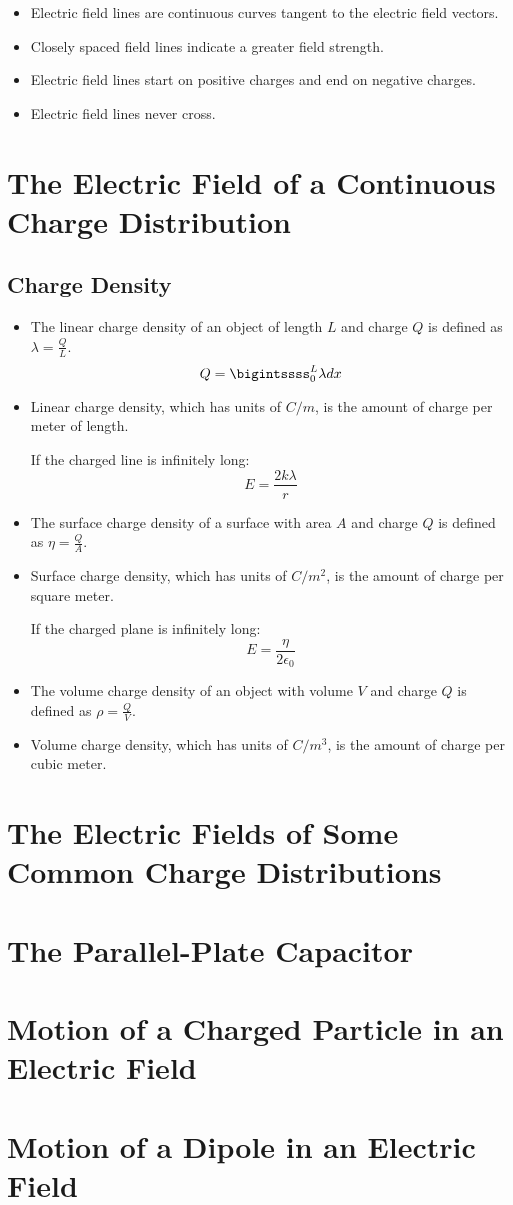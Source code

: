 \documentclass{article}
\begin{document}
\begin{itemize}
    \item Electric field lines are continuous curves tangent to the electric field vectors.
    \item Closely spaced field lines indicate a greater field strength.
    \item Electric field lines start on positive charges and end on negative charges.
    \item Electric field lines never cross.
\end{itemize}

\section*{The Electric Field of a Continuous Charge Distribution}

\subsection*{Charge Density}
\begin{itemize}
    \item The linear charge density of an object of length $L$ and charge $Q$ is defined as $\lambda=\frac{Q}{L}$.
    \[Q=\bigintssss_0^L\lambda dx\]
    \item Linear charge density, which has units of $C/m$, is the amount of charge per meter of length. \newline
    
    If the charged line is infinitely long:
    \[E=\frac{2k\lambda}{r}\]
    \item The surface charge density of a surface with area $A$ and charge $Q$ is defined as $\eta=\frac{Q}{A}$.
    \item Surface charge density, which has units of $C/m^2$, is the amount of charge per square meter.
    
    If the charged plane is infinitely long:
    \[E=\frac{\eta}{2\epsilon_0}\]
    \item The volume charge density of an object with volume $V$ and charge $Q$ is defined as $\rho=\frac{Q}{V}$.
    \item Volume charge density, which has units of $C/m^3$, is the amount of charge per cubic meter.
\end{itemize}

\section*{The Electric Fields of Some Common Charge Distributions}



\section*{The Parallel-Plate Capacitor}



\section*{Motion of a Charged Particle in an Electric Field}



\section*{Motion of a Dipole in an Electric Field}
\end{document}
